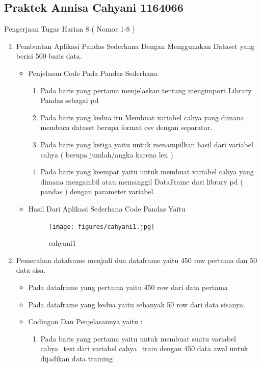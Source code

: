 \begin{enumerate}
\begin{itemize}
\subsection{Praktek Annisa Cahyani 1164066}
Pengerjaan Tugas Harian 8 ( Nomor 1-8 )
\begin{enumerate}
\item Pembuatan Aplikasi Pandas Sederhana Dengan Menggunakan Dataset yang  berisi 500 baris data.
\begin{itemize}
\item Penjelasan Code Pada Pandas Sederhana
\begin{enumerate}
\item Pada baris yang pertama menjelaskan tentang  mengimport Library Pandas sebagai pd
\item Pada baris yang kedua itu  Membuat variabel cahya yang dimana membaca dataset berupa format csv dengan separator.
\item Pada baris yang ketiga yaitu untuk  menampilkan hasil dari variabel cahya ( berupa jumlah/angka karena len )
\item Pada baris yang keempat yaitu untuk membuat variabel cahya yang dimana mengambil atau  memanggil DataFrame dari library pd ( pandas ) dengan parameter variabel.
\end{enumerate}
\item Hasil Dari Aplikasi Sederhana Code Pandas Yaitu
\begin{figure}[!hbtp]
\centering
\texttt{[image: figures/cahyani1.jpg]}
\caption{cahyani1}
\label{cahyani1}
\end{figure}
\par
\par
\end{itemize}
\par
\par
\item Pemecahan dataframe menjadi dua dataframe yaitu 450 row pertama dan 50 data sisa.
\begin{itemize}
\item Pada dataframe yang pertama yaitu  450 row dari data pertama
\item Pada dataframe yang kedua yaitu sebanyak  50 row dari data sisanya.
\item Codingan Dan Penjelasannya yaitu :
\begin{enumerate}
\item Pada baris yang pertama yaitu untuk membuat suatu variabel cahya_test dari variabel cahya_train dengan 450 data awal untuk dijadikan data training

\end{enumerate}
\end{itemize}
\end{enumerate}
\end{itemize}
\end{enumerate}
